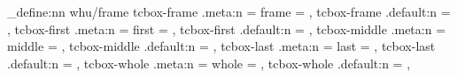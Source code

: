 
\def\tcb@proc@counter@with#1{%
  \csxdef{tcb@cnt@#1}{\kvtcb@new@counter}%
  \global\csletcs{thetcb@cnt@#1}{the\kvtcb@new@counter}%
  \appto\tcb@new@colopt{,code={\letcs\tcbcounter{tcb@cnt@#1}\letcs\thetcbcounter{thetcb@cnt@#1}}}%
}

\ExplSyntaxOn
\keys_define:nn { whu/frame }
  {
    tcbox-frame  .meta:n = { frame  = { \tcbox [{#1}] } } ,
    tcbox-frame .default:n = { } ,
    tcbox-first  .meta:n = { first  = { \tcbox [{#1}] } } ,
    tcbox-first .default:n = { } ,
    tcbox-middle .meta:n = { middle = { \tcbox [{#1}] } } ,
    tcbox-middle .default:n = { } ,
    tcbox-last   .meta:n = { last   = { \tcbox [{#1}] } } ,
    tcbox-last .default:n = { } ,
    tcbox-whole  .meta:n = { whole  = { \tcbox [{#1}] } } ,
    tcbox-whole .default:n = { } ,
  }